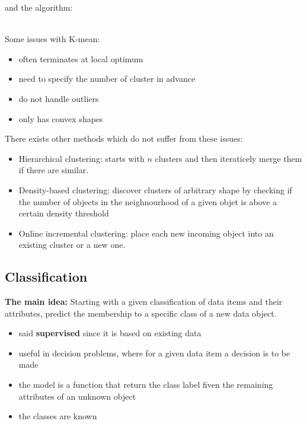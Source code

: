 and the algorithm:

\\
Some issues with K-mean:
\begin{itemize}
	\item often terminates at local optimum
	\item need to specify the number of cluster in advance
	\item do not handle outliers
	\item only has convex shapes
\end{itemize}
There exists other methods which do not suffer from these issues:
\begin{itemize}
	\item Hierarchical clustering: starts with $n$ clusters and then iteraticely merge them if there are similar.

	\item Density-based clustering: discover clusters of arbitrary shape by checking if the number of objects in the neighnourhood of a given objet is above a certain density threshold

	\item Online incremental clustering: place each new incoming object into an existing cluster or a new one.
\end{itemize}


\subsection{Classification}
\textbf{The main idea:} Starting with a given classification of data items and their attributes, predict the membership to a specific class of a new data object.

\begin{itemize}
	\item said \textbf{supervised} since it is based on existing data
	\item useful in decision problems, where for a given data item a decision is to be made
	\item the model is a function that return the class label fiven the remaining attributes of an unknown object
	\item the classes are known
\end{itemize}


